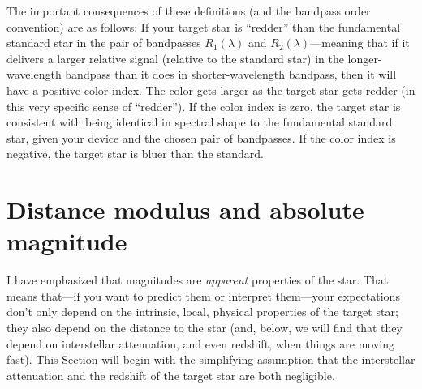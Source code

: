 \documentclass[10pt]{article}
\newcommand{\sectionname}{Section}
\begin{document}
The important consequences of these definitions (and the bandpass order convention) are as follows:
If your target star is ``redder'' than the fundamental standard star in the pair of bandpasses $R_1(\lambda)$ and $R_2(\lambda)$---meaning that if it delivers a larger relative signal (relative to the standard star) in the longer-wavelength bandpass than it does in shorter-wavelength bandpass, then it will have a positive color index.
The color gets larger as the target star gets redder (in this very specific sense of ``redder'').
If the color index is zero, the target star is consistent with being identical in spectral shape to the fundamental standard star, given your device and the chosen pair of bandpasses.
If the color index is negative, the target star is bluer than the standard.

\section{Distance modulus and absolute magnitude}\label{sec:absmag}

I have emphasized that magnitudes are \emph{apparent} properties of the star.
That means that---if you want to predict them or interpret them---your expectations don't only depend on the intrinsic, local, physical properties of the target star;
they also depend on the distance to the star (and, below, we will find that they depend on interstellar attenuation, and even redshift, when things are moving fast).
This \sectionname{} will begin with the simplifying assumption that the interstellar attenuation and the redshift of the target star are both negligible.
\end{document}
